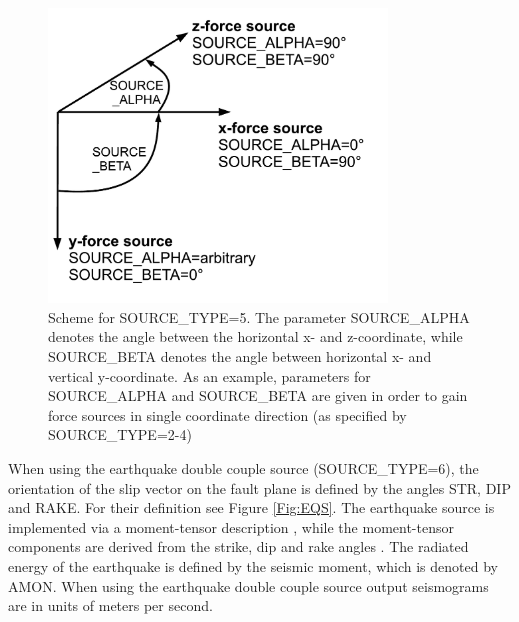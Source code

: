 \documentclass[11pt,onecolumn,oneside]{article}
\begin{document}
\begin{figure}
\begin{center}
\includegraphics[width=9cm,angle=0]{eps/coordinate_system_customforcesource.pdf}
\end{center}
\caption{Scheme for SOURCE\_TYPE=5. The parameter SOURCE\_ALPHA denotes the angle between the horizontal x- and z-coordinate, while SOURCE\_BETA denotes the angle between horizontal x- and vertical y-coordinate. As an example, parameters for SOURCE\_ALPHA and SOURCE\_BETA are given in order to gain force sources in single coordinate direction (as specified by SOURCE\_TYPE=2-4)}
\label{coordinate_system_customforcesource}
\end{figure}


When using the earthquake double couple source (SOURCE\_TYPE=6), the orientation of the slip vector on the fault plane is defined by the angles STR, DIP and RAKE. For their definition see Figure \ref{Fig:EQS}. The earthquake source is implemented via a moment-tensor description \cite{graves:96}, while the moment-tensor components are derived from the strike, dip and rake angles \cite{aki:80}. The radiated energy of the earthquake is defined by the seismic moment, which is denoted by AMON. When using the earthquake double couple source output seismograms are in units of meters per second.

\end{document}

